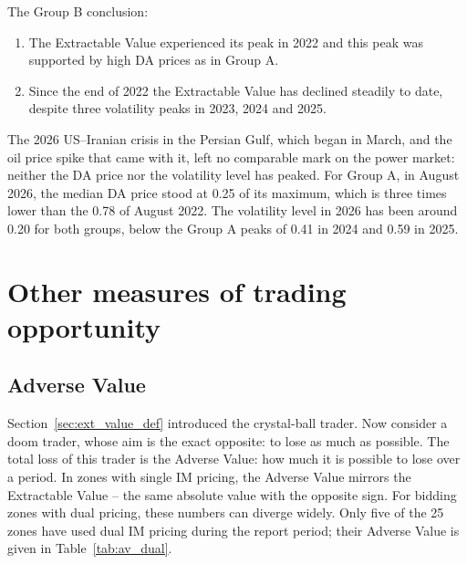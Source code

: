 \documentclass[11pt,a4paper]{article}
\begin{document}
The Group B conclusion:
\begin{enumerate}
\item The Extractable Value experienced its peak in 2022 and this peak was supported by high DA prices as in Group A.
\item Since the end of 2022 the Extractable Value has declined steadily to date, despite three volatility peaks in 2023, 2024 and 2025.
\end{enumerate}

The 2026 US--Iranian crisis in the Persian Gulf, which began in March, and the oil price spike that came with it, left no comparable mark on the power market: neither the DA price nor the volatility level has peaked. For Group A, in August 2026, the median DA price stood at 0.25 of its maximum, which is three times lower than the 0.78 of August 2022. The volatility level in 2026 has been around 0.20 for both groups, below the Group A peaks of 0.41 in 2024 and 0.59 in 2025.

\section{Other measures of trading opportunity}

\subsection{Adverse Value}

Section~\ref{sec:ext_value_def} introduced the crystal-ball trader. Now consider a doom trader, whose aim is the exact opposite: to lose as much as possible. The total loss of this trader is the Adverse Value: how much it is possible to lose over a period. In zones with single IM pricing, the Adverse Value mirrors the Extractable Value -- the same absolute value with the opposite sign. For bidding zones with dual pricing, these numbers can diverge widely. Only five of the 25 zones have used dual IM pricing during the report period; their Adverse Value is given in Table~\ref{tab:av_dual}.
\end{document}
